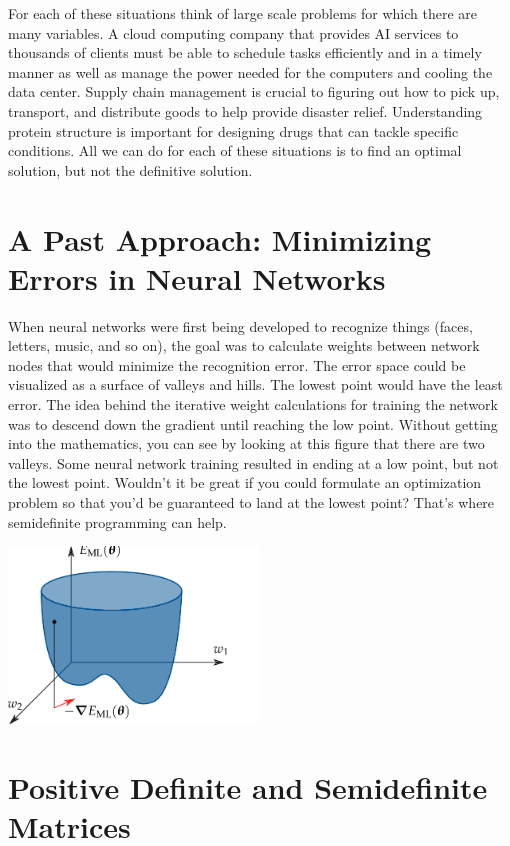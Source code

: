 For each of these situations think of large scale problems for which there are many variables. A cloud computing company that provides AI services to thousands of clients must be able to schedule tasks efficiently and in a timely manner as well as manage the power needed for the computers and cooling the data center. Supply chain management is crucial to figuring out how to pick up, transport, and distribute goods to help provide disaster relief. Understanding protein structure is important for designing drugs that can tackle specific conditions. All we can do for each of these situations is to find an optimal solution, but not the definitive solution.

\section{A Past Approach: Minimizing Errors in Neural Networks}

When neural networks were first being developed to recognize things (faces, letters, music, and so on), the goal was to calculate weights between network nodes that would minimize the recognition error. The error space could be visualized as a surface of valleys and hills. The lowest point would have the least error. The idea behind the iterative weight calculations for training the network was to descend down the gradient until reaching the low point. Without getting into the mathematics, you can see by looking at this figure that there are two valleys. Some neural network training resulted in ending at a low point, but not the lowest point. Wouldn’t it be great if you could formulate an optimization problem so that you’d be guaranteed to land at the lowest point? That's where semidefinite programming can help.

\includegraphics[width=0.5\textwidth]{neuralnet-error-function.png}

\section{Positive Definite and Semidefinite Matrices}

